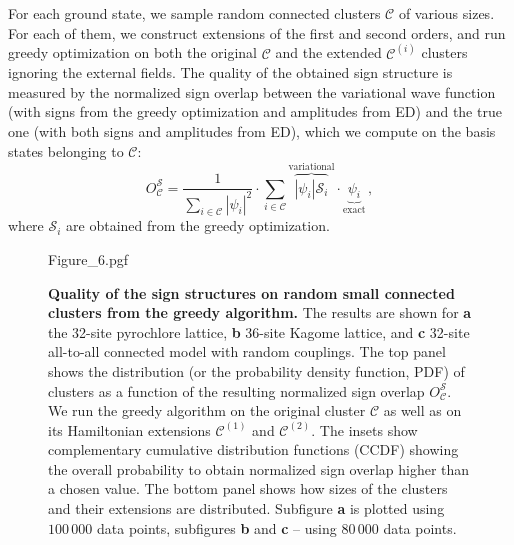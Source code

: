 For each ground state, we sample random connected clusters $\mathcal{C}$ of various sizes. For each of them, we construct extensions of the first and second orders, and run greedy optimization on both the original $\mathcal{C}$ and the extended $\mathcal{C}^{(i)}$ clusters ignoring the external fields. The quality of the obtained sign structure is measured by the normalized sign overlap between the variational wave function (with signs from the greedy optimization and amplitudes from ED) and the true one (with both signs and amplitudes from ED), which we compute on the basis states belonging to $\mathcal{C}$:
\begin{equation}
	O^\mathcal{S}_\mathcal{C} = \frac{1}{\sum_{i \in \mathcal{C}} |\psi_i|^2}
	\cdot \sum\limits_{i \in \mathcal{C}}
            \overbrace{|\psi_i|\mathcal{S}_i}^\text{variational}
            \cdot \underbrace{\psi_i}_\text{exact} \,,
\end{equation}
where $\mathcal{S}_i$ are obtained from the greedy optimization.

\begin{figure}[t]
    \centering
    {Figure_6.pgf}
    \caption{\label{fig:overlap_and_clusters}\textbf{Quality of the sign structures on random small connected clusters from the greedy algorithm.} The results are shown for \textbf{a} the 32-site pyrochlore lattice, \textbf{b} 36-site Kagome lattice, and \textbf{c} 32-site all-to-all connected model with random couplings. 
    The top panel shows the distribution (or the probability density function, PDF) of clusters as a function of the resulting normalized sign overlap $O^\mathcal{S}_\mathcal{C}$. We run the greedy algorithm on the original cluster $\mathcal{C}$ as well as on its Hamiltonian extensions $\mathcal{C}^{(1)}$ and $\mathcal{C}^{(2)}$. The insets show complementary cumulative distribution functions (CCDF) showing the overall probability to obtain normalized sign overlap higher than a chosen value. The bottom panel shows how sizes of the clusters and their extensions are distributed. Subfigure \textbf{a} is plotted using $100\,000$ data points, subfigures \textbf{b} and \textbf{c} -- using $80\,000$ data points.}
\end{figure}

